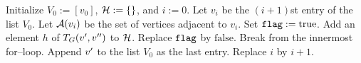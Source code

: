 \documentclass{amsart}
\numberwithin{procedure}{section}
\begin{document}
\begin{procedure}
\begin{algorithmic} %
\State Initialize $V_0:=[v_0]$,  $\mathord{\mathcal H}:= \{\}$, and $i:= 0$.
    \State Let $v_i$ be the $(i+1)$st entry of the list $V_0$.
    \State Let $\mathord{\mathcal A}(v_i)$ be the set of vertices adjacent to $v_i$.
    	\State  Set ${\tt flag}:=\mathrm{true}$.
            	\State Add an element $h$ of $T_G (v\sp\prime, v\sp{\prime\prime})$ to $\mathord{\mathcal H}$.
            	\State Replace ${\tt flag}$ by $\mathrm{false}$.
            	\State Break from the innermost for--loop.
            \EndIf
        \EndFor
        	\State Append $v\sp\prime$ to the list $V_0$ as the last entry.
        \EndIf
    \EndFor
    \State Replace $i$ by $i+1$.
\EndWhile
\end{algorithmic}
 \caption{A computational procedure on a graph}\label{procedure:genB} 
\end{procedure}
%
\end{document}
